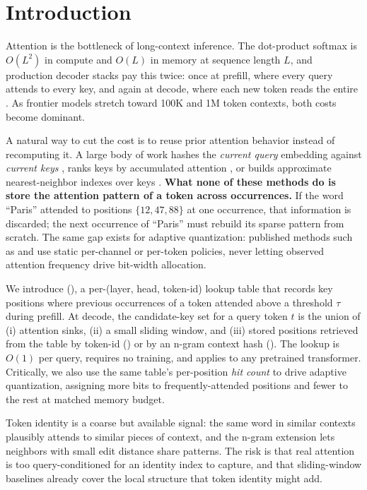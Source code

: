 \section{Introduction}
\label{sec:intro}

Attention is the bottleneck of long-context inference. The dot-product softmax is $O(L^2)$ in compute and $O(L)$ in memory at sequence length $L$, and production decoder stacks pay this twice: once at prefill, where every query attends to every key, and again at decode, where each new token reads the entire \kvcache. As frontier models stretch toward 100K and 1M token contexts, both costs become dominant.

A natural way to cut the cost is to reuse prior attention behavior instead of recomputing it. A large body of work hashes the \emph{current query} embedding against \emph{current keys} \citep{kitaev2020reformer,daras2020smyrf,liu2024hashevict,chen2024magicpig}, ranks keys by accumulated attention \citep{zhang2023h2o,xiao2023streamingllm}, or builds approximate nearest-neighbor indexes over keys \citep{liu2024retrievalattention}. {\bf What none of these methods do is store the attention pattern of a token across occurrences.} If the word ``Paris'' attended to positions $\{12, 47, 88\}$ at one occurrence, that information is discarded; the next occurrence of ``Paris'' must rebuild its sparse pattern from scratch. The same gap exists for adaptive \kvcache quantization: published methods such as \kivi \citep{liu2024kivi} and \kvquant \citep{hooper2024kvquant} use static per-channel or per-token policies, never letting observed attention frequency drive bit-width allocation.

 We introduce \ours (\hma), a per-(layer, head, token-id) lookup table that records key positions where previous occurrences of a token attended above a threshold $\tau$ during prefill. At decode, the candidate-key set for a query token $t$ is the union of (i) attention sinks, (ii) a small sliding window, and (iii) stored positions retrieved from the table by token-id (\hmaid) or by an n-gram context hash (\hmang). The lookup is $O(1)$ per query, requires no training, and applies to any pretrained transformer. Critically, we also use the same table's per-position \emph{hit count} to drive adaptive \kvcache quantization, assigning more bits to frequently-attended positions and fewer to the rest at matched memory budget.

 Token identity is a coarse but available signal: the same word in similar contexts plausibly attends to similar pieces of context, and the n-gram extension lets neighbors with small edit distance share patterns. The risk is that real attention is too query-conditioned for an identity index to capture, and that sliding-window baselines already cover the local structure that token identity might add.

